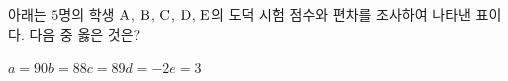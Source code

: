 아래는 $5$명의 학생 $\mathrm{A}$, $\mathrm{B}$, $\mathrm{C}$, $\mathrm{D}$, $\mathrm{E}$의 도덕 시험 점수와 편차를 조사하여 나타낸 표이다. 다음 중 옳은 것은?
\par\smallskip\begin{center}\resizebox{\ifdim\width>\linewidth\linewidth\else\width\fi}{!}{}\end{center}
\begin{choices32}{$a=90$}{$b=88$}{$c=89$}{$d=-2$}{$e=3$}\end{choices32}
